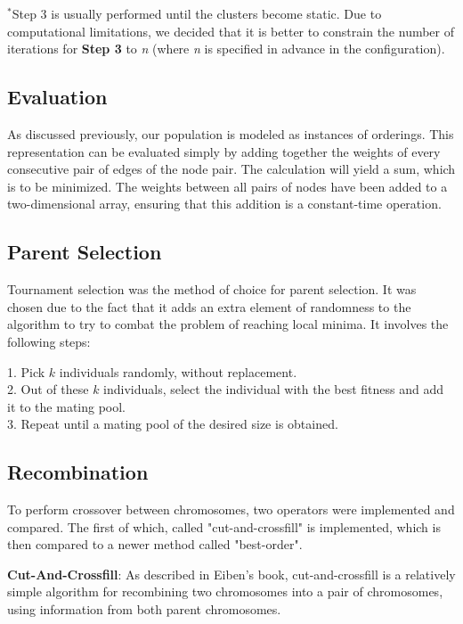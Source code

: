 \documentclass[12pt,twocolumn,oneside]{osajnl}
\begin{document}
$^{*}$Step 3 is usually performed until the clusters become static. Due to computational limitations, we decided that it is better to constrain the number of iterations for \textbf{Step 3} to \textit{n} (where \textit{n} is specified in advance in the configuration).

\subsection{Evaluation}
As discussed previously, our population is modeled as instances of orderings. This representation can be evaluated simply by adding together the weights of every consecutive pair of edges of the node pair. The calculation will yield a sum, which is to be minimized. The weights between all pairs of nodes have been added to a two-dimensional array, ensuring that this addition is a constant-time operation.

\subsection{Parent Selection}
Tournament selection was the method of choice for parent selection. It was chosen due to the fact that it adds an extra element of randomness to the algorithm to try to combat the problem of reaching local minima. It involves the following steps:

1. Pick $k$ individuals randomly, without replacement.\\
2. Out of these $k$ individuals, select the individual with the best fitness and add it to the mating pool.\\
3. Repeat until a mating pool of the desired size is obtained.\\

\subsection{Recombination}
To perform crossover between chromosomes, two operators were implemented and compared. The first of which, called "cut-and-crossfill" is implemented, which is then compared to a newer method called "best-order".

\textbf{Cut-And-Crossfill}: As described in Eiben's book, cut-and-crossfill is a relatively simple algorithm for recombining two chromosomes into a pair of chromosomes, using information from both parent chromosomes\cite{eiben2008introduction}.
\end{document}
